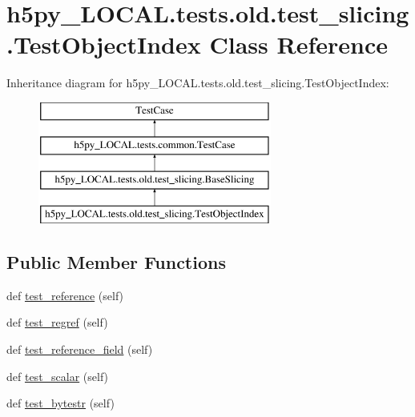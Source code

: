 \hypertarget{classh5py__LOCAL_1_1tests_1_1old_1_1test__slicing_1_1TestObjectIndex}{}\section{h5py\+\_\+\+L\+O\+C\+A\+L.\+tests.\+old.\+test\+\_\+slicing.\+Test\+Object\+Index Class Reference}
\label{classh5py__LOCAL_1_1tests_1_1old_1_1test__slicing_1_1TestObjectIndex}
Inheritance diagram for h5py\+\_\+\+L\+O\+C\+A\+L.\+tests.\+old.\+test\+\_\+slicing.\+Test\+Object\+Index\+:\begin{figure}[H]
\begin{center}
\leavevmode
\includegraphics[height=4.000000cm]{classh5py__LOCAL_1_1tests_1_1old_1_1test__slicing_1_1TestObjectIndex}
\end{center}
\end{figure}
\subsection*{Public Member Functions}
\begin{DoxyCompactItemize}
\item 
def \hyperlink{classh5py__LOCAL_1_1tests_1_1old_1_1test__slicing_1_1TestObjectIndex_acaa228791e96735fb71767d3837f58f7}{test\+\_\+reference} (self)
\item 
def \hyperlink{classh5py__LOCAL_1_1tests_1_1old_1_1test__slicing_1_1TestObjectIndex_ac801a829cfee3b39cf5655702cdb7ed7}{test\+\_\+regref} (self)
\item 
def \hyperlink{classh5py__LOCAL_1_1tests_1_1old_1_1test__slicing_1_1TestObjectIndex_a89832d9c0a73d04945748c0a3da9b606}{test\+\_\+reference\+\_\+field} (self)
\item 
def \hyperlink{classh5py__LOCAL_1_1tests_1_1old_1_1test__slicing_1_1TestObjectIndex_a95d8259abcf4dd98fa4a37cd928858bc}{test\+\_\+scalar} (self)
\item 
def \hyperlink{classh5py__LOCAL_1_1tests_1_1old_1_1test__slicing_1_1TestObjectIndex_a3506190b66f00b02eb42a11f44853c82}{test\+\_\+bytestr} (self)
\end{DoxyCompactItemize}
